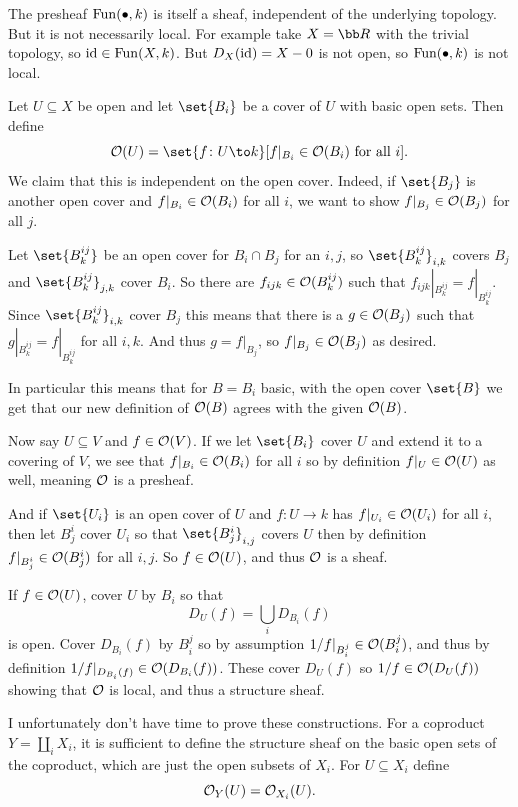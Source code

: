     The presheaf ${\rm Fun}(\bullet,k)$ is itself a sheaf, independent of the underlying topology.
    But it is not necessarily local.
    For example take $X=\bR$ with the trivial topology, so ${\rm id}\in{\rm Fun}(X,k)$.
    But $D_X({\rm id})=X-0$ is not open, so ${\rm Fun}(\bullet,k)$ is not local.

    \item Let $U\subseteq X$ be open and let $\set{B_i}$ be a cover of $U$ with basic open sets.
    Then define
    $$ \O(U) = \set{f\colon U\to k}[f|_{B_i}\in\O(B_i)\hbox{ for all $i$}] . $$
    We claim that this is independent on the open cover.
    Indeed, if $\set{B_j}$ is another open cover and $f|_{B_i}\in{{\cal O}}(B_i)$ for all $i$, we want to show $f|_{B_j}\in{{\cal O}}(B_j)$ for all $j$.

    Let $\set{B^{ij}_k}$ be an open cover for $B_i\cap B_j$ for an $i,j$, so $\set{B^{ij}_k}_{i,k}$ covers $B_j$ and $\set{B^{ij}_k}_{j,k}$
    cover $B_i$.
    So there are $f_{ijk}\in{{\cal O}}(B^{ij}_k)$ such that $f_{ijk}|_{B^{ij}_k}=f|_{B^{ij}_k}$.
    Since $\set{B^{ij}_k}_{i,k}$ cover $B_j$ this means that there is a $g\in{{\cal O}}(B_j)$ such that $g|_{B^{ij}_k}=f|_{B^{ij}_k}$ for all
    $i,k$.
    And thus $g=f|_{B_j}$, so $f|_{B_j}\in{{\cal O}}(B_j)$ as desired.

    In particular this means that for $B=B_i$ basic, with the open cover $\set{B}$ we get that our new definition of ${{\cal O}}(B)$
    agrees with the given ${{\cal O}}(B)$.

    Now say $U\subseteq V$ and $f\in{{\cal O}}(V)$.
    If we let $\set{B_i}$ cover $U$ and extend it to a covering of $V$, we see that $f|_{B_i}\in{{\cal O}}(B_i)$ for all $i$ so by definition
    $f|_U\in{{\cal O}}(U)$ as well, meaning ${{\cal O}}$ is a presheaf.

    And if $\set{U_i}$ is an open cover of $U$ and $f\colon U\to k$ has $f|_{U_i}\in{{\cal O}}(U_i)$ for all $i$, then let $B^i_j$ cover $U_i$
    so that $\set{B^i_j}_{i,j}$ covers $U$ then by definition $f|_{B^i_j}\in{{\cal O}}(B^i_j)$ for all $i,j$.
    So $f\in{{\cal O}}(U)$, and thus ${{\cal O}}$ is a sheaf.

    If $f\in{{\cal O}}(U)$, cover $U$ by $B_i$ so that
    $$ D_U(f) = \bigcup_iD_{B_i}(f) $$
    is open.
    Cover $D_{B_i}(f)$ by $B^j_i$ so by assumption $1/f|_{B^j_i}\in{{\cal O}}(B^j_i)$, and thus by definition $1/f|_{D_{B_i}(f)}\in{{\cal O}}(D_{B_i}(f))$.
    These cover $D_U(f)$ so $1/f\in{{\cal O}}(D_U(f))$ showing that ${{\cal O}}$ is local, and thus a structure sheaf.

    \item I unfortunately don't have time to prove these constructions.
    For a coproduct $Y=\coprod_iX_i$, it is sufficient to define the structure sheaf on the basic open sets of the coproduct,
    which are just the open subsets of $X_i$.
    For $U\subseteq X_i$ define
    $$ {{\cal O}}_Y(U) = {{\cal O}}_{X_i}(U) . $$

